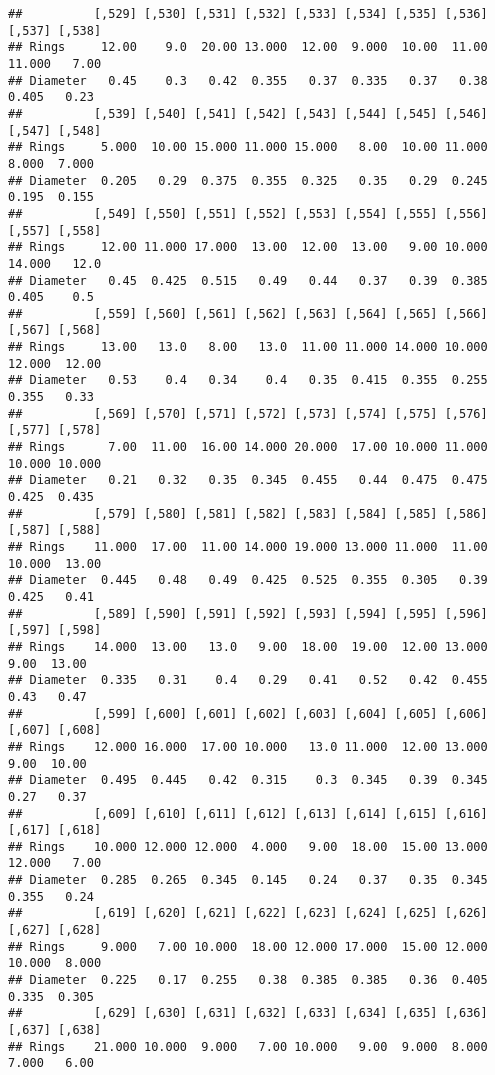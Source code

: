 \documentclass[
]{article}
\begin{document}
\begin{verbatim}
##          [,529] [,530] [,531] [,532] [,533] [,534] [,535] [,536] [,537] [,538]
## Rings     12.00    9.0  20.00 13.000  12.00  9.000  10.00  11.00 11.000   7.00
## Diameter   0.45    0.3   0.42  0.355   0.37  0.335   0.37   0.38  0.405   0.23
##          [,539] [,540] [,541] [,542] [,543] [,544] [,545] [,546] [,547] [,548]
## Rings     5.000  10.00 15.000 11.000 15.000   8.00  10.00 11.000  8.000  7.000
## Diameter  0.205   0.29  0.375  0.355  0.325   0.35   0.29  0.245  0.195  0.155
##          [,549] [,550] [,551] [,552] [,553] [,554] [,555] [,556] [,557] [,558]
## Rings     12.00 11.000 17.000  13.00  12.00  13.00   9.00 10.000 14.000   12.0
## Diameter   0.45  0.425  0.515   0.49   0.44   0.37   0.39  0.385  0.405    0.5
##          [,559] [,560] [,561] [,562] [,563] [,564] [,565] [,566] [,567] [,568]
## Rings     13.00   13.0   8.00   13.0  11.00 11.000 14.000 10.000 12.000  12.00
## Diameter   0.53    0.4   0.34    0.4   0.35  0.415  0.355  0.255  0.355   0.33
##          [,569] [,570] [,571] [,572] [,573] [,574] [,575] [,576] [,577] [,578]
## Rings      7.00  11.00  16.00 14.000 20.000  17.00 10.000 11.000 10.000 10.000
## Diameter   0.21   0.32   0.35  0.345  0.455   0.44  0.475  0.475  0.425  0.435
##          [,579] [,580] [,581] [,582] [,583] [,584] [,585] [,586] [,587] [,588]
## Rings    11.000  17.00  11.00 14.000 19.000 13.000 11.000  11.00 10.000  13.00
## Diameter  0.445   0.48   0.49  0.425  0.525  0.355  0.305   0.39  0.425   0.41
##          [,589] [,590] [,591] [,592] [,593] [,594] [,595] [,596] [,597] [,598]
## Rings    14.000  13.00   13.0   9.00  18.00  19.00  12.00 13.000   9.00  13.00
## Diameter  0.335   0.31    0.4   0.29   0.41   0.52   0.42  0.455   0.43   0.47
##          [,599] [,600] [,601] [,602] [,603] [,604] [,605] [,606] [,607] [,608]
## Rings    12.000 16.000  17.00 10.000   13.0 11.000  12.00 13.000   9.00  10.00
## Diameter  0.495  0.445   0.42  0.315    0.3  0.345   0.39  0.345   0.27   0.37
##          [,609] [,610] [,611] [,612] [,613] [,614] [,615] [,616] [,617] [,618]
## Rings    10.000 12.000 12.000  4.000   9.00  18.00  15.00 13.000 12.000   7.00
## Diameter  0.285  0.265  0.345  0.145   0.24   0.37   0.35  0.345  0.355   0.24
##          [,619] [,620] [,621] [,622] [,623] [,624] [,625] [,626] [,627] [,628]
## Rings     9.000   7.00 10.000  18.00 12.000 17.000  15.00 12.000 10.000  8.000
## Diameter  0.225   0.17  0.255   0.38  0.385  0.385   0.36  0.405  0.335  0.305
##          [,629] [,630] [,631] [,632] [,633] [,634] [,635] [,636] [,637] [,638]
## Rings    21.000 10.000  9.000   7.00 10.000   9.00  9.000  8.000  7.000   6.00

\end{verbatim}
\end{document}
